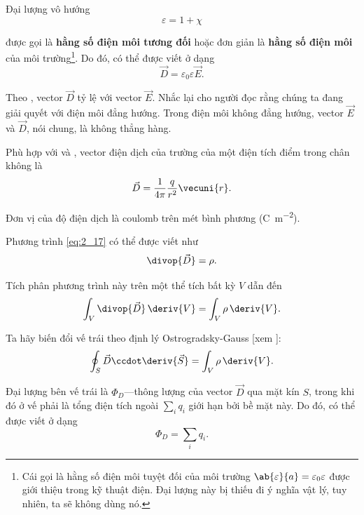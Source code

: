 Đại lượng vô hướng
\begin{equation}\label{eq:2_20}
    \varepsilon = 1 + \chi
\end{equation}

\noindent
được gọi là \textbf{hằng số điện môi tương đối} hoặc đơn giản là \textbf{hằng số điện môi} của môi trường\footnote{Cái gọi là hằng số điện môi tuyệt đối của môi trường $\ab{\varepsilon}{a}=\varepsilon_0\varepsilon$ được giới thiệu trong kỹ thuật điện. Đại lượng này bị thiếu đi ý nghĩa vật lý, tuy nhiên, ta sẽ không dùng nó.}. Do đó,  có thể được viết ở dạng
\begin{equation}\label{eq:2_21}
    \vec{D} = \varepsilon_0 \varepsilon \vec{E}.
\end{equation}

\noindent
Theo , vector $\vec{D}$ tỷ lệ với vector $\vec{E}$. Nhắc lại cho người đọc rằng chúng ta đang giải quyết với điện môi đẳng hướng. Trong điện môi không đẳng hướng, vector $\vec{E}$ và $\vec{D}$, nói chung, là không thẳng hàng.

Phù hợp với  và , vector điện dịch của trường của một điện tích điểm trong chân không là
\begin{equation}\label{eq:2_22}
    \vec{D} = \frac{1}{4\pi} \frac{q}{r^2} \vecuni{r}.
\end{equation}

Đơn vị của độ điện dịch là coulomb trên mét bình phương (\si{\coulomb\per\metre\squared}).

Phương trình \eqref{eq:2_17} có thể được viết như
\begin{equation}\label{eq:2_23}
    \divop{\vec{D}} = \rho.
\end{equation}

\noindent
Tích phân phương trình này trên một thể tích bất kỳ $V$ dẫn đến
\begin{equation*}
    \int_V \divop{\vec{D}}\, \deriv{V} = \int_V \rho\, \deriv{V}.
\end{equation*}

\noindent
Ta hãy biến đổi vế trái theo định lý Ostrogradsky-Gauss [xem ]:
\begin{equation}\label{eq:2_24}
    \oint_S \vec{D} \ccdot \deriv{\vec{S}} = \int_V \rho\, \deriv{V}.
\end{equation}

\noindent
Đại lượng bên vế trái là $\Phi_D$---thông lượng của vector $\vec{D}$ qua mặt kín $S$, trong khi đó ở vế phải là tổng điện tích ngoài $\sum_iq_i$ giới hạn bởi bề mặt này. Do đó,  có thể được viết ở dạng
\begin{equation}\label{eq:2_25}
    \Phi_D = \sum_i q_i.
\end{equation}

